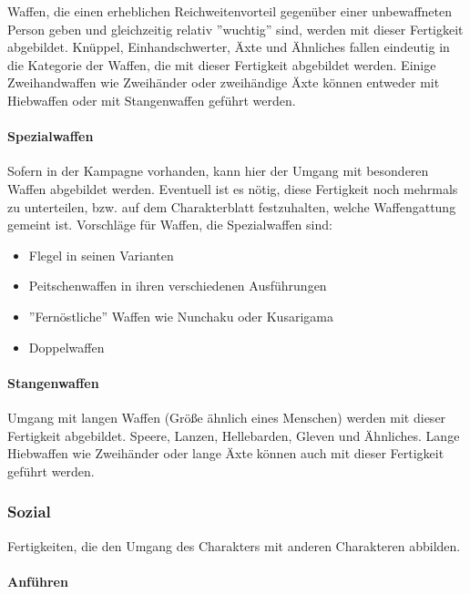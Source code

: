 \documentclass{article}
\begin{document}
Waffen, die einen erheblichen Reichweitenvorteil gegenüber einer unbewaffneten Person geben und gleichzeitig relativ
''wuchtig'' sind, werden mit dieser Fertigkeit abgebildet. Knüppel, Einhandschwerter, Äxte und Ähnliches fallen
eindeutig in die Kategorie der Waffen, die mit dieser Fertigkeit abgebildet werden. Einige Zweihandwaffen wie
Zweihänder oder zweihändige Äxte können entweder mit Hiebwaffen oder mit Stangenwaffen geführt werden.

\paragraph{Spezialwaffen}

Sofern in der Kampagne vorhanden, kann hier der Umgang mit besonderen Waffen abgebildet werden. Eventuell ist es nötig,
diese Fertigkeit noch mehrmals zu unterteilen, bzw. auf dem Charakterblatt festzuhalten, welche Waffengattung gemeint
ist. Vorschläge für Waffen, die Spezialwaffen sind:

\begin{itemize}
\item Flegel in seinen Varianten
\item Peitschenwaffen in ihren verschiedenen Ausführungen
\item ''Fernöstliche'' Waffen wie Nunchaku oder Kusarigama
\item Doppelwaffen
\end{itemize}

\paragraph{Stangenwaffen}

Umgang mit langen Waffen (Größe ähnlich eines Menschen) werden mit dieser Fertigkeit abgebildet. Speere, Lanzen,
Hellebarden, Gleven und Ähnliches. Lange Hiebwaffen wie Zweihänder oder lange Äxte können auch mit dieser Fertigkeit
geführt werden.

\subsubsection{Sozial}

Fertigkeiten, die den Umgang des Charakters mit anderen Charakteren abbilden.

\paragraph{Anführen}
\end{document}
